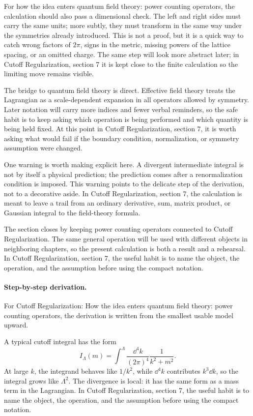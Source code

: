 For how the idea enters quantum field theory: power counting operators, the calculation should also pass a dimensional check.  The left and right sides must carry the same units; more subtly, they must transform in the same way under the symmetries already introduced.  This is not a proof, but it is a quick way to catch wrong factors of \(2\pi\), signs in the metric, missing powers of the lattice spacing, or an omitted charge.  The same step will look more abstract later; in Cutoff Regularization, section 7 it is kept close to the finite calculation so the limiting move remains visible.

The bridge to quantum field theory is direct.  Effective field theory treats the Lagrangian as a scale-dependent expansion in all operators allowed by symmetry.  Later notation will carry more indices and fewer verbal reminders, so the safe habit is to keep asking which operation is being performed and which quantity is being held fixed.  At this point in Cutoff Regularization, section 7, it is worth asking what would fail if the boundary condition, normalization, or symmetry assumption were changed.

One warning is worth making explicit here.  A divergent intermediate integral is not by itself a physical prediction; the prediction comes after a renormalization condition is imposed.  This warning points to the delicate step of the derivation, not to a decorative aside.  In Cutoff Regularization, section 7, the calculation is meant to leave a trail from an ordinary derivative, sum, matrix product, or Gaussian integral to the field-theory formula.

The section closes by keeping power counting operators connected to Cutoff Regularization.  The same general operation will be used with different objects in neighboring chapters, so the present calculation is both a result and a rehearsal.  In Cutoff Regularization, section 7, the useful habit is to name the object, the operation, and the assumption before using the compact notation.



\paragraph{Step-by-step derivation.}

For Cutoff Regularization: How the idea enters quantum field theory: power counting operators, the derivation is written from the smallest usable model upward.

A typical cutoff integral has the form
\[
  I_\Lambda(m)=\int^{\Lambda}\frac{\dd^4k}{(2\pi)^4}\frac{1}{k^2+m^2}.
\]
At large \(k\), the integrand behaves like \(1/k^2\), while \(\dd^4k\) contributes \(k^3\dd k\), so the integral grows like \(\Lambda^2\).  The divergence is local: it has the same form as a mass term in the Lagrangian.  In Cutoff Regularization, section 7, the useful habit is to name the object, the operation, and the assumption before using the compact notation.

